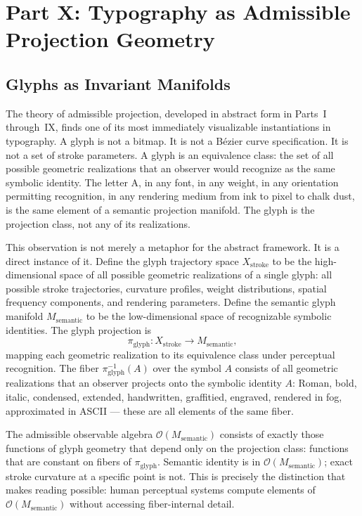 \documentclass[12pt, a4paper]{article}
\theoremstyle{essaystyle}
\begin{document}
\section{Part X: Typography as Admissible Projection Geometry}

\subsection{Glyphs as Invariant Manifolds}

The theory of admissible projection, developed in abstract form in Parts~I through~IX,
finds one of its most immediately visualizable instantiations in typography. A glyph
is not a bitmap. It is not a Bézier curve specification. It is not a set of stroke
parameters. A glyph is an equivalence class: the set of all possible geometric
realizations that an observer would recognize as the same symbolic identity. The
letter A, in any font, in any weight, in any orientation permitting recognition, in
any rendering medium from ink to pixel to chalk dust, is the same element of a
semantic projection manifold. The glyph is the projection class, not any of its
realizations.

This observation is not merely a metaphor for the abstract framework. It is a direct
instance of it. Define the glyph trajectory space $X_{\mathrm{stroke}}$ to be the
high-dimensional space of all possible geometric realizations of a single glyph:
all possible stroke trajectories, curvature profiles, weight distributions, spatial
frequency components, and rendering parameters. Define the semantic glyph manifold
$M_{\mathrm{semantic}}$ to be the low-dimensional space of recognizable symbolic
identities. The glyph projection is
\[
\pi_{\mathrm{glyph}} : X_{\mathrm{stroke}} \longrightarrow M_{\mathrm{semantic}},
\]
mapping each geometric realization to its equivalence class under perceptual recognition.
The fiber $\pi_{\mathrm{glyph}}^{-1}(A)$ over the symbol $A$ consists of all geometric
realizations that an observer projects onto the symbolic identity $A$: Roman,
bold, italic, condensed, extended, handwritten, graffitied, engraved, rendered in
fog, approximated in ASCII --- these are all elements of the same fiber.

The admissible observable algebra $\mathcal{O}(M_{\mathrm{semantic}})$ consists of
exactly those functions of glyph geometry that depend only on the projection class:
functions that are constant on fibers of $\pi_{\mathrm{glyph}}$. Semantic identity
is in $\mathcal{O}(M_{\mathrm{semantic}})$; exact stroke curvature at a specific point
is not. This is precisely the distinction that makes reading possible: human perceptual
systems compute elements of $\mathcal{O}(M_{\mathrm{semantic}})$ without accessing
fiber-internal detail.
\end{document}

